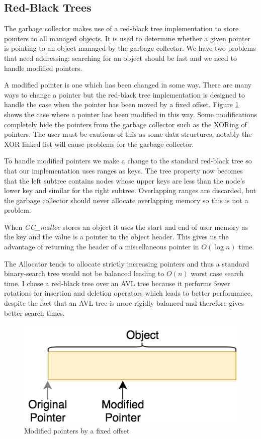 \documentclass[../diss.tex]{subfiles}
\begin{document}
\subsection{Red-Black Trees} \label{sec:rbtree}

The garbage collector makes use of a red-black tree implementation\cite{algorithms} to store pointers to all managed objects. It is used to determine whether a given pointer is pointing to an object managed by the garbage collector. We have two problems that need addressing: searching for an object should be fast and we need to handle modified pointers.

A modified pointer is one which has been changed in some way. There are many ways to change a pointer but the red-black tree implementation is designed to handle the case when the pointer has been moved by a fixed offset. Figure \ref{fig:modifiedpointers} shows the case where a pointer has been modified in this way. Some modifications completely hide the pointers from the garbage collector such as the XORing of pointers. The user must be cautious of this as some data structures, notably the XOR linked list will cause problems for the garbage collector.


To handle modified pointers we make a change to the standard red-black tree so that our implementation uses ranges as keys. The tree property now becomes that the left subtree contains nodes whose upper keys are less than the node's lower key and similar for the right subtree. Overlapping ranges are discarded, but the garbage collector should never allocate overlapping memory so this is not a problem.

When \emph{GC\_malloc} stores an object it uses the start and end of user memory as the key and the value is a pointer to the object header. This gives us the advantage of returning the header of a miscellaneous pointer in $O(\log n)$ time.

The Allocator tends to allocate strictly increasing pointers and thus a standard binary-search tree would not be balanced leading to $O(n)$ worst case search time. I chose a red-black tree over an AVL tree because it performs fewer rotations for insertion and deletion operators which leads to better performance, despite the fact that an AVL tree is more rigidly balanced and therefore gives better search times.

\begin{figure}
    \centering
    \includegraphics[max width=0.7\linewidth]{figs/modifiedpointers.png}
    \caption{Modified pointers by a fixed offset}
    \label{fig:modifiedpointers}
\end{figure}
\end{document}
